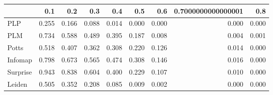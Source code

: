\begin{tabular}{lrrrrrrrr}
\toprule
{} &   0.1 &   0.2 &   0.3 &   0.4 &   0.5 &   0.6 & 0.7000000000000001 &   0.8 \\
\midrule
PLP      & 0.255 & 0.166 & 0.088 & 0.014 & 0.000 & 0.000 &              0.000 & 0.000 \\
PLM      & 0.734 & 0.588 & 0.489 & 0.395 & 0.187 & 0.008 &              0.004 & 0.001 \\
Potts    & 0.518 & 0.407 & 0.362 & 0.308 & 0.220 & 0.126 &              0.014 & 0.000 \\
Infomap  & 0.798 & 0.673 & 0.565 & 0.474 & 0.308 & 0.146 &              0.016 & 0.000 \\
Surprise & 0.943 & 0.838 & 0.604 & 0.400 & 0.229 & 0.107 &              0.010 & 0.000 \\
Leiden   & 0.505 & 0.352 & 0.208 & 0.085 & 0.009 & 0.002 &              0.000 & 0.000 \\
\bottomrule
\end{tabular}
